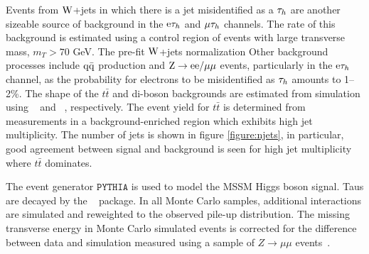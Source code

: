 Events from $\mathrm{W}$+jets in which there is a jet misidentified as 
a $\mathrm{\tau}_h$ are another sizeable source of background in the 
$\mathrm{e}\mathrm{\tau}_h$ and $\mathrm{\mu}\mathrm{\tau}_h$ channels.
The rate of this background is estimated using a control region 
of events with large transverse mass, $m_{T}>70$ GeV. The
pre-fit $\mathrm{W}$+jets normalization 
Other background processes include $\mathrm{q}\mathrm{\bar{q}}$ production
and $\mathrm{Z}\to \mathrm{e}\mathrm{e}/\mathrm{\mu}\mathrm{\mu}$ events, particularly in the $\mathrm{e}\mathrm{\tau}_h$ channel, 
as the probability for electrons to be misidentified as $\mathrm{\tau}_h$ amounts to 1--2\%.
The shape of the $t\bar{t}$  and di-boson backgrounds are estimated from simulation 
using \MADGRAPH~\cite{Alwall:2007st} and \PYTHIA~\cite{Pythia}, respectively. 
The event yield for $t\bar{t}$ is determined from measurements in a background-enriched region
which exhibits high jet multiplicity. 
The number of jets is shown in figure \ref{figure:njets}, in particular, good agreement
between signal and background is seen for high jet multiplicity where $t\bar{t}$ dominates.

The event generator $\mathtt{PYTHIA}$ is used to model the MSSM Higgs boson signal.
Taus are decayed by the \TAUOLA~\cite{TAUOLA} package.
In all Monte Carlo  samples, additional interactions are simulated and reweighted to the observed pile-up distribution.  
The missing transverse energy in Monte Carlo simulated events is 
corrected for the difference between data and simulation 
measured using a sample of $Z\rightarrow\mu\mu$ events~\cite{CMS-EWK-WZ}.



